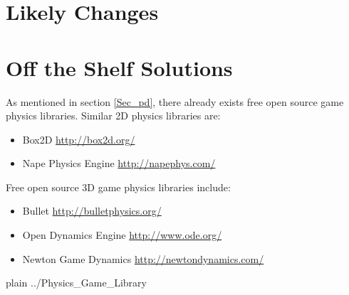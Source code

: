 \documentclass[12pt]{article}
\begin{document}
%
%

\section{Likely Changes}    


%
%

\section{Off the Shelf Solutions}   \label{sec_otss}
As mentioned in section \ref{Sec_pd}, there already exists free open source game
physics libraries. Similar 2D physics libraries are:
\begin{itemize} 
\item Box2D   \url{http://box2d.org/}
\item Nape Physics Engine  \url{http://napephys.com/}
\end{itemize}

\noindent
Free open source 3D game physics libraries include:
\begin{itemize} 
\item Bullet   \url{http://bulletphysics.org/}
\item Open Dynamics Engine  \url{http://www.ode.org/}
\item Newton Game Dynamics  \url{http://newtondynamics.com/}
\end{itemize}

 {plain}
 {../Physics_Game_Library}
\end{document}
